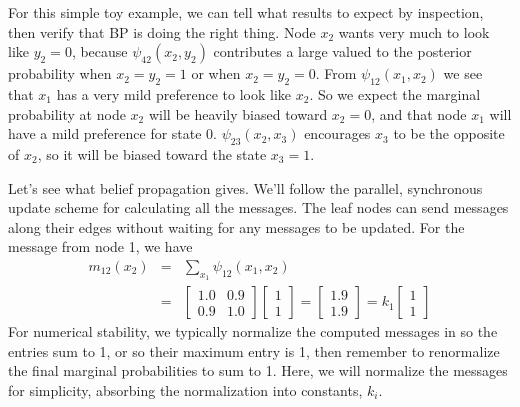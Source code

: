 For this simple toy example, we can tell what results to expect by inspection, then verify that BP is doing the right thing.  Node $x_2$ wants very much to look like $y_2=0$, because
$\psi_{42}(x_2, y_2)$ contributes a large valued to the posterior
probability when $x_2 = y_2 = 1$ or when $x_2 = y_2 = 0$.  From
$\psi_{12}(x_1, x_2) $ we see that
$x_1$ has a very mild preference to
look like $x_2$.  So we expect the marginal probability at node $x_2$
will be heavily biased toward $x_2=0$, and that node $x_1$ will have a
mild preference for state 0.  $\psi_{23}(x_2, x_3)$ encourages 
$x_3$ to be the opposite of $x_2$, so it will be biased toward the state $x_3=1$.

Let's see what belief propagation gives.  We'll
follow the parallel, synchronous update scheme for calculating
all the messages.  The leaf nodes can send messages along their
edges without waiting for any messages to be updated.  For the message
from node 1, we have
\begin{eqnarray} 
m_{12}(x_2) & = & \sum_{x_1} \psi_{12} (x_1, x_2)  \nonumber \\
& = & 
\begin{bmatrix} 
1.0 & 0.9 \\ 
0.9 & 1.0 
\end{bmatrix}
\begin{bmatrix}
1 \\ 
1
\end{bmatrix}
=
\begin{bmatrix}
1.9 \\ 
1.9
\end{bmatrix}
=
k_1
\begin{bmatrix}
1 \\ 
1
\end{bmatrix}
\end{eqnarray} 
For numerical stability, we typically normalize the computed messages in \eqn{\ref{eq:bpupdate}} so
the entries sum to 1, or so their maximum entry is 1, then remember
to renormalize the final marginal probabilities to sum to 1.
Here, we will normalize the messages for simplicity, absorbing the normalization into constants, $k_i$.

